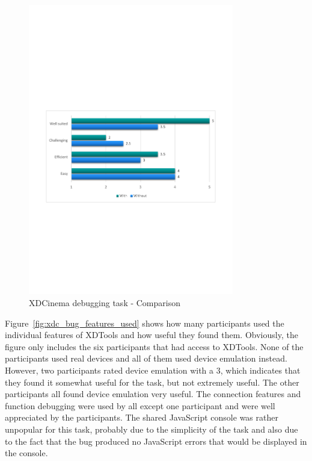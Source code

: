 \begin{figure}[H]
  \centering
    \includegraphics[trim={0 0 0.1cm 0},clip,width=0.80\textwidth]{images/charts/xdc_bug_comparison.pdf}
	\caption[xdc-bug: Comparison]{XDCinema debugging task - Comparison}
	\label{fig:xdc_bug_comparison}
\end{figure}

Figure~\ref{fig:xdc_bug_features_used} shows how many participants used the individual features of XDTools and how useful they found them. Obviously, the figure only includes the six participants that had access to XDTools. None of the participants used real devices and all of them used device emulation instead. However, two participants rated device emulation with a 3, which indicates that they found it somewhat useful for the task, but not extremely useful. The other participants all found device emulation very useful. The connection features and function debugging were used by all except one participant and were well appreciated by the participants. The shared JavaScript console was rather unpopular for this task, probably due to the simplicity of the task and also due to the fact that the bug produced no JavaScript errors that would be displayed in the console.

